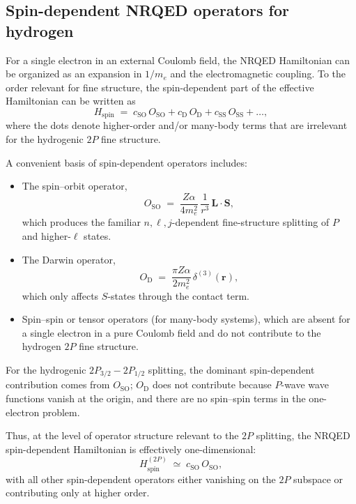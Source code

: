 \documentclass[11pt,a4paper]{article}
\begin{document}
\subsection{Spin-dependent NRQED operators for hydrogen}

For a single electron in an external Coulomb field, the NRQED
Hamiltonian can be organized as an expansion in $1/m_e$ and the
electromagnetic coupling. To the order relevant for fine structure, the
spin-dependent part of the effective Hamiltonian can be written as
\begin{equation}
  H_{\text{spin}} \;=\;
  c_{\text{SO}}\, O_{\text{SO}}
  + c_{\text{D}}\, O_{\text{D}}
  + c_{\text{SS}}\, O_{\text{SS}}
  + \dots,
  \label{eq:nrqed-spin}
\end{equation}
where the dots denote higher-order and/or many-body terms that are
irrelevant for the hydrogenic $2P$ fine structure.

A convenient basis of spin-dependent operators includes:
\begin{itemize}
  \item The spin--orbit operator,
    \begin{equation}
      O_{\text{SO}}
      \;=\;
      \frac{Z\alpha}{4 m_e^2}\,\frac{1}{r^3}\,\mathbf{L}\cdot\mathbf{S},
      \label{eq:oso-def}
    \end{equation}
    which produces the familiar $n,\ell,j$-dependent fine-structure
    splitting of $P$ and higher-$\ell$ states.
  \item The Darwin operator,
    \begin{equation}
      O_{\text{D}}
      \;=\;
      \frac{\pi Z\alpha}{2 m_e^2}\,\delta^{(3)}(\mathbf{r}),
      \label{eq:odarwin-def}
    \end{equation}
    which only affects $S$-states through the contact term.
  \item Spin--spin or tensor operators (for many-body systems), which
    are absent for a single electron in a pure Coulomb field and do not
    contribute to the hydrogen $2P$ fine structure.
\end{itemize}
For the hydrogenic $2P_{3/2} - 2P_{1/2}$ splitting, the dominant
spin-dependent contribution comes from $O_{\text{SO}}$; $O_{\text{D}}$
does not contribute because $P$-wave wave functions vanish at the
origin, and there are no spin--spin terms in the one-electron problem.

Thus, at the level of operator structure relevant to the $2P$ splitting,
the NRQED spin-dependent Hamiltonian is effectively one-dimensional:
\begin{equation}
  H_{\text{spin}}^{(2P)} \;\simeq\; c_{\text{SO}}\, O_{\text{SO}},
  \label{eq:spin-2P}
\end{equation}
with all other spin-dependent operators either vanishing on the $2P$
subspace or contributing only at higher order.
\end{document}
